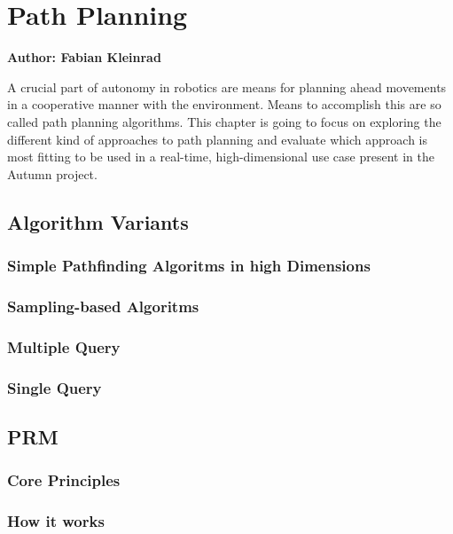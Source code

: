 \chapter{Path Planning}

\textbf{Author: Fabian Kleinrad} 

A crucial part of autonomy in robotics are means for planning ahead movements in a cooperative manner with the environment. Means to accomplish this are so called path planning algorithms. This chapter is going to focus on exploring the different kind of approaches to path planning and evaluate which approach is most fitting to be used in a real-time, high-dimensional use case present in the Autumn project.


\section{Algorithm Variants}

\subsection{Simple Pathfinding Algoritms in high Dimensions}

\subsection{Sampling-based Algoritms}

\subsection{Multiple Query}

\subsection{Single Query}

\section{PRM}

\subsection{Core Principles}

\subsection{How it works}

